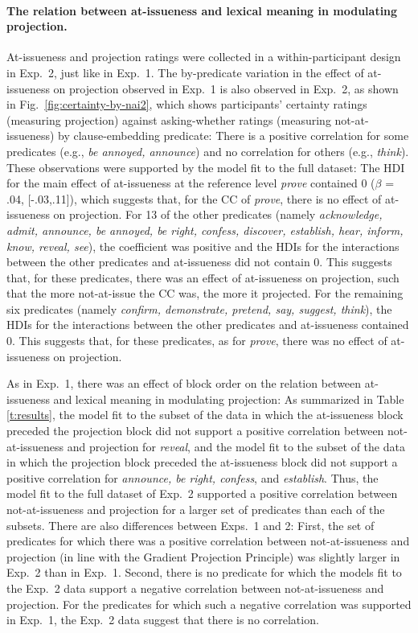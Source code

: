 \documentclass[11pt,fleqn]{article}
\newcommand{\6}{\mbox{$[\hspace*{-.6mm}[$}}
\newcommand{\9}{\mbox{$]\hspace*{-.6mm}]$}}
\begin{document}
\paragraph{The relation between at-issueness and lexical meaning in modulating projection.} At-issueness and projection ratings were collected in a within-participant design in Exp.~2, just like in Exp.~1. The by-predicate variation in the effect of at-issueness on projection observed in Exp.~1 is also observed in Exp.~2, as shown in Fig.~\ref{fig:certainty-by-nai2}, which shows participants' certainty ratings (measuring projection) against asking-whether ratings (measuring not-at-issueness) by clause-embedding predicate: There is a positive correlation for some predicates (e.g., {\em be annoyed, announce}) and no correlation for others (e.g., {\em think}). These observations were supported by the model fit to the full dataset: The HDI for the main effect of at-issueness at the reference level {\em prove} contained 0 ($\beta$ = .04, [-.03,.11]), which suggests that, for the CC of {\em prove}, there is no effect of at-issueness on projection. For 13 of the other predicates (namely {\em acknowledge, admit, announce, be annoyed, be right, confess, discover, establish, hear, inform, know, reveal, see}), the coefficient was positive and the HDIs for the interactions between the other predicates and at-issueness did not contain 0. This suggests that, for these predicates, there was an effect of at-issueness on projection, such that the more not-at-issue the CC was, the more it projected. For the remaining six predicates (namely {\em confirm, demonstrate, pretend, say, suggest, think}), the HDIs for the interactions between the other predicates and at-issueness contained 0. This suggests that, for these predicates, as for \emph{prove}, there was no effect of at-issueness on projection. 

As in Exp.~1, there was an effect of block order on the relation between at-issueness and lexical meaning in modulating projection: As summarized in Table \ref{t:results}, the model fit to the subset of the data in which the at-issueness block preceded the projection block did not support a positive correlation between not-at-issueness and projection for {\em reveal}, and the model fit to the subset of the data in which the projection block preceded the at-issueness block did not support a positive correlation for {\em announce, be right, confess}, and {\em establish}. Thus, the model fit to the full dataset of Exp.~2 supported a positive correlation between not-at-issueness and projection for a larger set of predicates than each of the subsets. There are also differences between Exps.~1 and 2: First, the set of predicates for which there was a positive correlation between not-at-issueness and projection (in line with the Gradient Projection Principle) was slightly larger in Exp.~2 than in Exp.~1. Second,  there is no predicate for which the models fit to the Exp.~2 data support a negative correlation between not-at-issueness and projection. For the predicates for which such a negative correlation was supported in Exp.~1, the Exp.~2 data suggest that there is no correlation.
\end{document}
